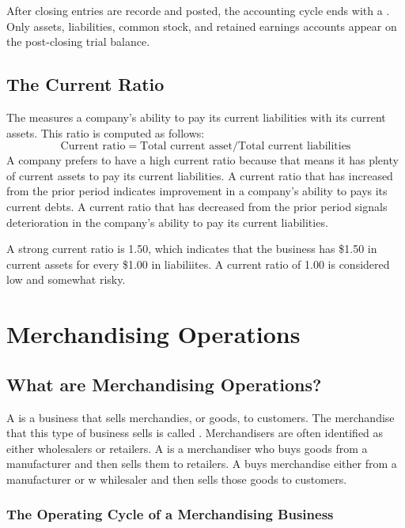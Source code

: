 \documentclass{article}
\begin{document}
After closing entries are recorde and posted, the accounting cycle ends with a . Only assets, liabilities, common stock, and retained earnings accounts appear on the post-closing trial balance. 

\subsection{The Current Ratio}

The  measures a company's ability to pay its current liabilities with its current assets. This ratio is computed as follows: $$\textrm{Current ratio} = \textrm{Total current asset} / \textrm{Total current liabilities}$$ A company prefers to have a high current ratio because that means it has plenty of current assets to pay its current liabilities. A current ratio that has increased from the prior period indicates improvement in a company's ability to pays its current debts. A current ratio that has decreased from the prior period signals deterioration in the company's ability to pay its current liabilities. 

\begin{remark}
  A strong current ratio is 1.50, which indicates that the business has \$1.50 in current assets for every \$1.00 in liabiliites. A current ratio of 1.00 is considered low and somewhat risky. 
\end{remark}

\section{Merchandising Operations}

\subsection{What are Merchandising Operations?}

A  is a business that sells merchandies, or goods, to customers. The merchandise that this type of business sells is called . Merchandisers are often identified as either wholesalers or retailers. A  is a merchandiser who buys goods from a manufacturer and then sells them to retailers. A  buys merchandise either from a manufacturer or w whilesaler and then sells those goods to customers. 

\subsubsection{The Operating Cycle of a Merchandising Business}
\end{document}
